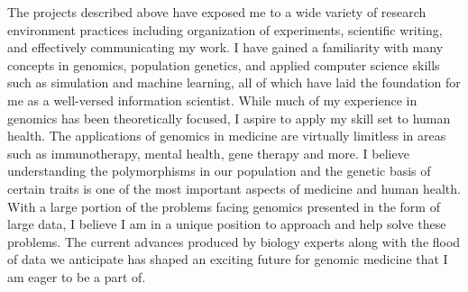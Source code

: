 \documentclass[10pt]{amsart}
\newcommand{\sepspace}{\vspace*{1em}}		%
\begin{document}
The projects described above have exposed me to a wide variety of research environment practices including organization of experiments, scientific writing, and effectively communicating my work. 
I have gained a familiarity with many concepts in genomics, population genetics, and applied computer science skills such as simulation and machine learning,
all of which have laid the foundation for me as a well-versed information scientist. 
While much of my experience in genomics has been theoretically focused, I aspire to apply my skill set to human health. 
The applications of genomics in medicine are virtually limitless in areas such as immunotherapy, mental health, gene therapy and more. 
I believe understanding the polymorphisms in our population and the genetic basis of certain traits is one of the most important aspects of medicine and human health. 
With a large portion of the problems facing genomics presented in the form of large data, I believe I am in a unique position to approach and help solve these problems.
The current advances produced by biology experts along with the flood of data we anticipate has shaped an exciting future for genomic medicine that I am eager to be a part of. 
\sepspace
\end{document}
